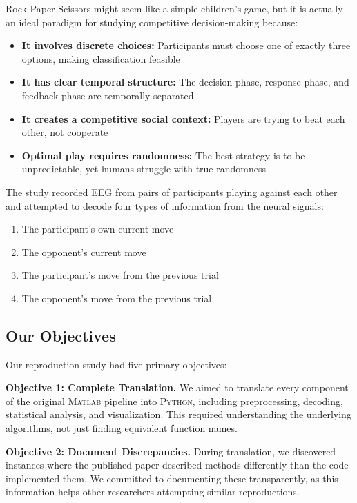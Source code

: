 \documentclass[11pt,a4paper]{article}
\newcommand{\matlab}{\textsc{Matlab}}
\newcommand{\python}{\textsc{Python}}
\begin{document}
Rock-Paper-Scissors might seem like a simple children's game, but it is actually an ideal paradigm for studying competitive decision-making because:

\begin{itemize}
    \item \textbf{It involves discrete choices:} Participants must choose one of exactly three options, making classification feasible
    \item \textbf{It has clear temporal structure:} The decision phase, response phase, and feedback phase are temporally separated
    \item \textbf{It creates a competitive social context:} Players are trying to beat each other, not cooperate
    \item \textbf{Optimal play requires randomness:} The best strategy is to be unpredictable, yet humans struggle with true randomness
\end{itemize}

The study recorded EEG from pairs of participants playing against each other and attempted to decode four types of information from the neural signals:
\begin{enumerate}
    \item The participant's own current move
    \item The opponent's current move
    \item The participant's move from the previous trial
    \item The opponent's move from the previous trial
\end{enumerate}

\subsection{Our Objectives}
\label{subsec:objectives}

Our reproduction study had five primary objectives:

\textbf{Objective 1: Complete Translation.} We aimed to translate every component of the original \matlab{} pipeline into \python{}, including preprocessing, decoding, statistical analysis, and visualization. This required understanding the underlying algorithms, not just finding equivalent function names.

\textbf{Objective 2: Document Discrepancies.} During translation, we discovered instances where the published paper described methods differently than the code implemented them. We committed to documenting these transparently, as this information helps other researchers attempting similar reproductions.
\end{document}
